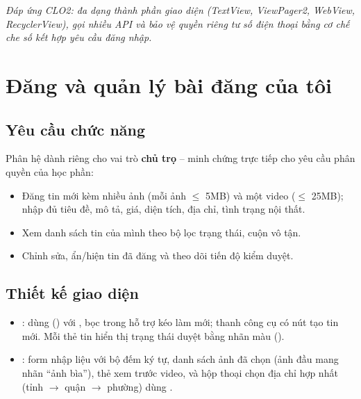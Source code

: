 \textit{Đáp ứng CLO2: đa dạng thành phần giao diện (TextView, ViewPager2,
WebView, RecyclerView), gọi nhiều API và bảo vệ quyền riêng tư số điện
thoại bằng cơ chế che số kết hợp yêu cầu đăng nhập.}

\section{Đăng và quản lý bài đăng của tôi}

\subsection{Yêu cầu chức năng}
Phân hệ dành riêng cho vai trò \textbf{chủ trọ} -- minh chứng trực tiếp cho
yêu cầu phân quyền của học phần:
\begin{itemize}
    \item Đăng tin mới kèm nhiều ảnh (mỗi ảnh $\le$ 5MB) và một video
    ($\le$ 25MB); nhập đủ tiêu đề, mô tả, giá, diện tích, địa chỉ, tình trạng
    nội thất.
    \item Xem danh sách tin của mình theo bộ lọc trạng thái, cuộn vô tận.
    \item Chỉnh sửa, ẩn/hiện tin đã đăng và theo dõi tiến độ kiểm duyệt.
\end{itemize}

\subsection{Thiết kế giao diện}
\begin{itemize}
    \item {}: dùng 
    () với , bọc trong
     hỗ trợ kéo làm mới; thanh công cụ có nút tạo
    tin mới. Mỗi thẻ tin hiển thị trạng thái duyệt bằng nhãn màu
    ().
    \item {}: form nhập liệu với bộ đếm ký tự,
    danh sách ảnh đã chọn (ảnh đầu mang nhãn ``ảnh bìa''), thẻ xem trước
    video, và hộp thoại chọn địa chỉ hợp nhất (tỉnh $\rightarrow$ quận
    $\rightarrow$ phường) dùng .
\end{itemize}



